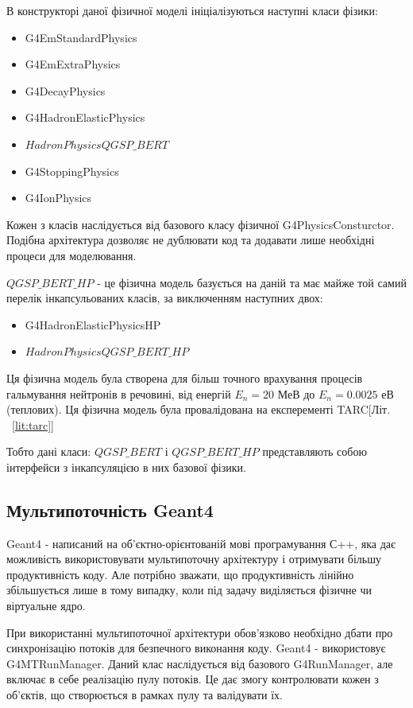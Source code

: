 \documentclass[a4paper, 14pt]{article}
\numberwithin{equation}{section}
\numberwithin{table}{section}
\begin{document}
В конструкторі даної фізичної моделі ініціалізуються наступні класи фізики: 
\begin{itemize}
	\item G4EmStandardPhysics
	\item G4EmExtraPhysics
	\item G4DecayPhysics
	\item G4HadronElasticPhysics
	\item $HadronPhysicsQGSP\_BERT$
	\item G4StoppingPhysics
	\item G4IonPhysics
\end{itemize}
Кожен з класів наслідується від базового класу фізичної G4PhysicsConsturctor. Подібна архітектура дозволяє не дублювати код та додавати лише необхідні процеси для моделювання.

$QGSP\_BERT\_HP$ - це фізична модель базується на даній та має майже той самий перелік інкапсульованих класів, за виключенням наступних двох:
\begin{itemize}
	\item G4HadronElasticPhysicsHP
	\item $HadronPhysicsQGSP\_BERT\_HP$
\end{itemize}
Ця фізична модель була створена для більш точного врахування процесів гальмування нейтронів в речовині, від енергій $E_n = 20$ МеВ до $E_n = 0.0025$ еВ (теплових). Ця фізична модель була провалідована на експеременті TARC[Літ. ~\ref{lit:tarc}]

Тобто дані класи: $QGSP\_BERT$ і $QGSP\_BERT\_HP$ представляють собою інтерфейси з інкапсуляцією в них базової фізики.
	
\subsection{Мультипоточність Geant4}
Geant4 - написаний на об'єктно-орієнтованій мові програмування С++, яка дає можливість використовувати мультипоточну архітектуру і отримувати більшу продуктивність коду. Але потрібно зважати, що продуктивність лінійно збільшується лише в тому випадку, коли під задачу виділяється фізичне чи віртуальне ядро. 
	
При використанні мультипоточної архітектури обов'язково необхідно дбати про синхронізацію потоків для безпечного виконання коду. Geant4 - використовує G4MTRunManager. Даний клас наслідується від базового G4RunManager, але включає в себе реалізацію пулу потоків. Це дає змогу контролювати кожен з об'єктів, що створюється в рамках пулу та валідувати їх. 
\end{document}
